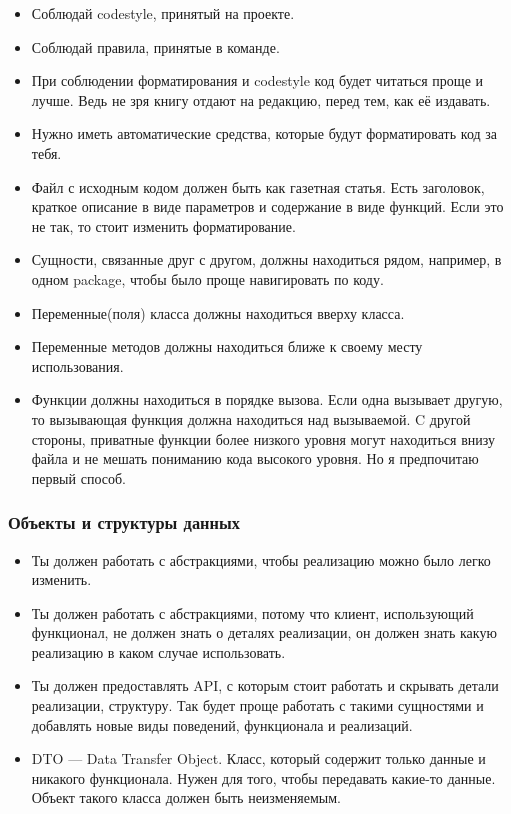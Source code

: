 \begin{itemize}
	\item Соблюдай codestyle, принятый на проекте.
	\item Соблюдай правила, принятые в команде.
	\item При соблюдении форматирования и codestyle код будет читаться проще и лучше. Ведь не зря книгу отдают на редакцию, перед тем, как её издавать.
	\item Нужно иметь автоматические средства, которые будут форматировать код за тебя.
	\item Файл с исходным кодом должен быть как газетная статья. Есть заголовок, краткое описание в виде параметров и содержание в виде функций. Если это не так, то стоит изменить форматирование.
	\item Сущности, связанные друг с другом, должны находиться рядом, например, в одном package, чтобы было проще навигировать по коду.
	\item Переменные(поля) класса должны находиться вверху класса.
	\item Переменные методов должны находиться ближе к своему месту использования.
	\item Функции должны находиться в порядке вызова. Если одна вызывает другую, то вызывающая функция должна находиться над вызываемой. C другой стороны, приватные функции более низкого уровня могут находиться внизу файла и не мешать пониманию кода высокого уровня. Но я предпочитаю первый способ.
\end{itemize}

\subsubsection{Объекты и структуры данных}

\begin{itemize}
	\item Ты должен работать с абстракциями, чтобы реализацию можно было легко изменить.
	\item Ты должен работать с абстракциями, потому что клиент, использующий функционал, не должен знать о деталях реализации, он должен знать какую реализацию в каком случае использовать.
	\item Ты должен предоставлять API, с которым стоит работать и скрывать детали реализации, структуру. Так будет проще работать с такими сущностями и добавлять новые виды поведений, функционала и реализаций.
	\item DTO — Data Transfer Object. Класс, который содержит только данные и никакого функционала. Нужен для того, чтобы передавать какие-то данные. Объект такого класса должен быть неизменяемым.
\end{itemize}

